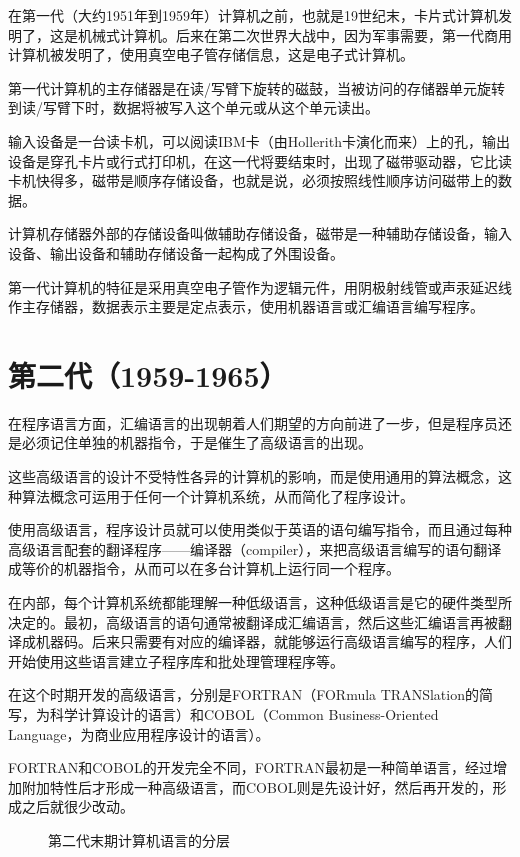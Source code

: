 在第一代（大约1951年到1959年）计算机之前，也就是19世纪末，卡片式计算机发明了，这是机械式计算机。后来在第二次世界大战中，因为军事需要，第一代商用计算机被发明了，使用真空电子管存储信息，这是电子式计算机。

第一代计算机的主存储器是在读/写臂下旋转的磁鼓，当被访问的存储器单元旋转到读/写臂下时，数据将被写入这个单元或从这个单元读出。

输入设备是一台读卡机，可以阅读IBM卡（由Hollerith卡演化而来）上的孔，输出设备是穿孔卡片或行式打印机，在这一代将要结束时，出现了磁带驱动器，它比读卡机快得多，磁带是顺序存储设备，也就是说，必须按照线性顺序访问磁带上的数据。

计算机存储器外部的存储设备叫做辅助存储设备，磁带是一种辅助存储设备，输入设备、输出设备和辅助存储设备一起构成了外围设备。

第一代计算机的特征是采用真空电子管作为逻辑元件，用阴极射线管或声汞延迟线作主存储器，数据表示主要是定点表示，使用机器语言或汇编语言编写程序。

\section{第二代（1959-1965）}

在程序语言方面，汇编语言的出现朝着人们期望的方向前进了一步，但是程序员还是必须记住单独的机器指令，于是催生了高级语言的出现。

这些高级语言的设计不受特性各异的计算机的影响，而是使用通用的算法概念，这种算法概念可运用于任何一个计算机系统，从而简化了程序设计。

使用高级语言，程序设计员就可以使用类似于英语的语句编写指令，而且通过每种高级语言配套的翻译程序——编译器（compiler），来把高级语言编写的语句翻译成等价的机器指令，从而可以在多台计算机上运行同一个程序。

在内部，每个计算机系统都能理解一种低级语言，这种低级语言是它的硬件类型所决定的。最初，高级语言的语句通常被翻译成汇编语言，然后这些汇编语言再被翻译成机器码。后来只需要有对应的编译器，就能够运行高级语言编写的程序，人们开始使用这些语言建立子程序库和批处理管理程序等。

在这个时期开发的高级语言，分别是FORTRAN（FORmula TRANSlation的简写，为科学计算设计的语言）和COBOL（Common Business-Oriented Language，为商业应用程序设计的语言）。

FORTRAN和COBOL的开发完全不同，FORTRAN最初是一种简单语言，经过增加附加特性后才形成一种高级语言，而COBOL则是先设计好，然后再开发的，形成之后就很少改动。

\begin{figure}[!h]
\centering
\caption{第二代末期计算机语言的分层}
\end{figure}

